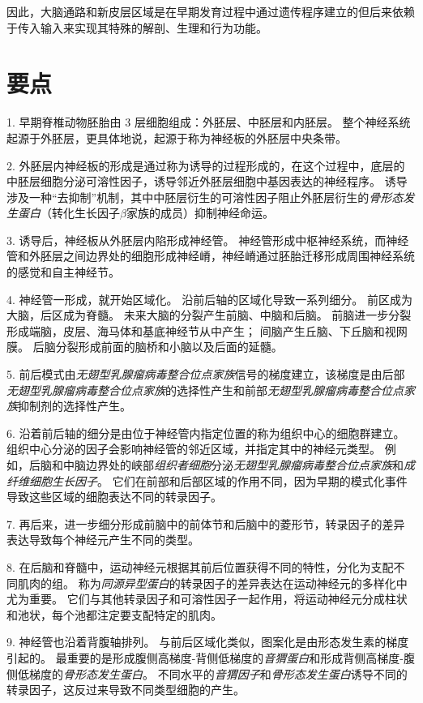 因此，大脑通路和新皮层区域是在早期发育过程中通过遗传程序建立的但后来依赖于传入输入来实现其特殊的解剖、生理和行为功能。



\section{要点}

1. 早期脊椎动物胚胎由 3 层细胞组成：外胚层、中胚层和内胚层。
整个神经系统起源于外胚层，更具体地说，起源于称为神经板的外胚层中央条带。


2. 外胚层内神经板的形成是通过称为诱导的过程形成的，在这个过程中，底层的中胚层细胞分泌可溶性因子，诱导邻近外胚层细胞中基因表达的神经程序。
诱导涉及一种“去抑制”机制，其中中胚层衍生的可溶性因子阻止外胚层衍生的\textit{骨形态发生蛋白}（转化生长因子$\beta$家族的成员）抑制神经命运。


3. 诱导后，神经板从外胚层内陷形成神经管。
神经管形成中枢神经系统，而神经管和外胚层之间边界处的细胞形成神经嵴，神经嵴通过胚胎迁移形成周围神经系统的感觉和自主神经节。


4. 神经管一形成，就开始区域化。
沿前后轴的区域化导致一系列细分。
前区成为大脑，后区成为脊髓。
未来大脑的分裂产生前脑、中脑和后脑。
前脑进一步分裂形成端脑，皮层、海马体和基底神经节从中产生；
间脑产生丘脑、下丘脑和视网膜。
后脑分裂形成前面的脑桥和小脑以及后面的延髓。


5. 前后模式由\textit{无翅型乳腺瘤病毒整合位点家族}信号的梯度建立，该梯度是由后部\textit{无翅型乳腺瘤病毒整合位点家族}的选择性产生和前部\textit{无翅型乳腺瘤病毒整合位点家族}抑制剂的选择性产生。


6. 沿着前后轴的细分是由位于神经管内指定位置的称为组织中心的细胞群建立。
组织中心分泌的因子会影响神经管的邻近区域，并指定其中的神经元类型。
例如，后脑和中脑边界处的峡部\textit{组织者细胞}分泌\textit{无翅型乳腺瘤病毒整合位点家族}和\textit{成纤维细胞生长因子}。
它们在前部和后部区域的作用不同，因为早期的模式化事件导致这些区域的细胞表达不同的转录因子。


7. 再后来，进一步细分形成前脑中的前体节和后脑中的菱形节，转录因子的差异表达导致每个神经元产生不同的类型。 


8. 在后脑和脊髓中，运动神经元根据其前后位置获得不同的特性，分化为支配不同肌肉的组。
称为\textit{同源异型蛋白}的转录因子的差异表达在运动神经元的多样化中尤为重要。
它们与其他转录因子和可溶性因子一起作用，将运动神经元分成柱状和池状，每个池都注定要支配特定的肌肉。 


9. 神经管也沿着背腹轴排列。
与前后区域化类似，图案化是由形态发生素的梯度引起的。
最重要的是形成腹侧高梯度-背侧低梯度的\textit{音猬蛋白}和形成背侧高梯度-腹侧低梯度的\textit{骨形态发生蛋白}。
不同水平的\textit{音猬因子}和\textit{骨形态发生蛋白}诱导不同的转录因子，这反过来导致不同类型细胞的产生。


